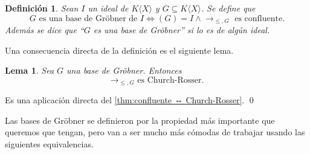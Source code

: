 \documentclass[12pt]{report}
\theoremstyle{customstyle}
\newtheorem{definition}[theorem]{Definición}
\newtheorem{lemma}[theorem]{Lema}
\renewenvironment{proof}[1][\proofname]{{\noindent \bfseries #1: }}{\qed} %
\theoremstyle{factstyle}
\begin{document}
\begin{definition}\label{def:base de Gröbner}
  Sean $I$ un ideal de $K⟨X⟩$ y $G ⊆ K⟨X⟩$. Se define que
  \[G\text{ es una base de Gröbner de }I ⇔ (G) = I ∧ →_{≤, G}\text{ es confluente} \text{.} \]
  Además se dice que ``$G$ es una base de Gröbner'' si lo es de algún ideal.
\end{definition}

Una consecuencia directa de la definición es el siguiente lema.

\begin{lemma}\label{lemma:→ gröbner es Church-Rosser}
  Sea $G$ una base de Gröbner. Entonces
  \[→_{≤, G}\text{ es Church-Rosser.}\]
\end{lemma}
\begin{proof}
  Es una aplicación directa del \cref{thm:confluente ⇔ Church-Rosser}.
\end{proof}

Las bases de Gröbner se definieron por la propiedad más importante que queremos que tengan, pero van a ser mucho más cómodas de trabajar usando las siguientes equivalencias.
\end{document}
